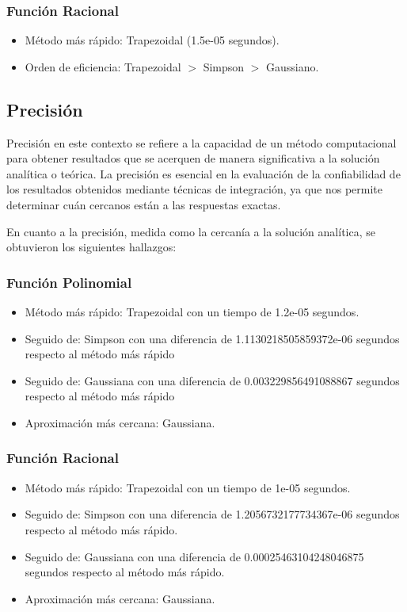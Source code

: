 \documentclass[a4paper]{article}
\begin{document}
    \subsubsection{Función Racional}
    \begin{itemize}
        \item Método más rápido: Trapezoidal (1.5e-05 segundos).
        \item Orden de eficiencia: Trapezoidal $>$ Simpson $>$ Gaussiano.
    \end{itemize} 

    
    \subsection{Precisión}
    Precisión en este contexto se refiere a la capacidad de un método computacional para obtener 
    resultados que se acerquen de manera significativa a la solución analítica o teórica. La precisión es 
    esencial en la evaluación de la confiabilidad de los resultados obtenidos mediante técnicas de
    integración, ya que nos permite determinar cuán cercanos están a las respuestas exactas.

    En cuanto a la precisión, medida como la cercanía a la solución analítica, se obtuvieron los 
    siguientes hallazgos:

    \subsubsection{Función Polinomial}
    \begin{itemize}
        \item Método más rápido: Trapezoidal con un tiempo de 1.2e-05 segundos.
        \item Seguido de: Simpson con una diferencia de 1.1130218505859372e-06 segundos respecto al método más rápido
        \item Seguido de: Gaussiana con una diferencia de 0.003229856491088867 segundos respecto al método más rápido
        \item Aproximación más cercana: Gaussiana.
    \end{itemize} 

    \subsubsection{Función Racional}
    \begin{itemize}
        \item Método más rápido: Trapezoidal con un tiempo de 1e-05 segundos.
        \item Seguido de: Simpson con una diferencia de 1.2056732177734367e-06 segundos respecto al método más rápido.
        \item Seguido de: Gaussiana con una diferencia de 0.00025463104248046875 segundos respecto al método más rápido.
        \item Aproximación más cercana: Gaussiana. 
    \end{itemize}
\end{document}
